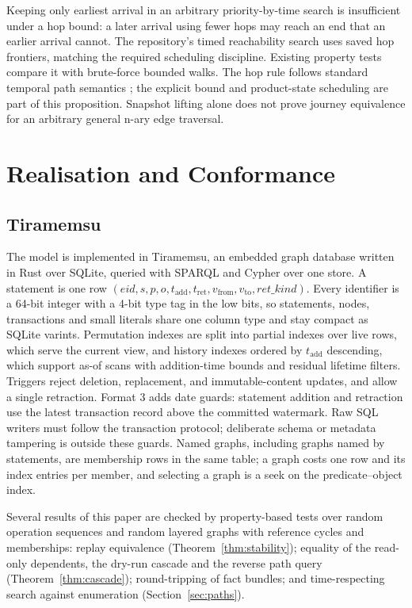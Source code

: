 \documentclass[11pt]{article}
\theoremstyle{plain}
\theoremstyle{definition}
\theoremstyle{remark}
\newcommand{\tadd}{t_{\mathrm{add}}}
\newcommand{\tret}{t_{\mathrm{ret}}}
\begin{document}
Keeping only earliest arrival in an arbitrary priority-by-time search is
insufficient under a hop bound: a later arrival using fewer hops may reach an
end that an earlier arrival cannot. The repository's timed reachability search
uses saved hop frontiers, matching the required scheduling discipline. Existing
property tests compare it with brute-force bounded walks. The hop rule follows
standard temporal path semantics \cite{wu2014path}; the explicit bound and
product-state scheduling are part of this proposition. Snapshot lifting alone
does not prove journey equivalence for an arbitrary general n-ary edge traversal.

\section{Realisation and Conformance}\label{sec:impl}

\subsection{Tiramemsu}

The model is implemented in Tiramemsu, an embedded graph database written in Rust
over SQLite, queried with SPARQL and Cypher over one store. A statement is one
row $(\mathit{eid},s,p,o,\tadd,\tret,v_{\mathrm{from}},v_{\mathrm{to}},\mathit{ret\_kind})$.
Every identifier is a 64-bit integer with a 4-bit type tag in the low bits, so
statements, nodes, transactions and small literals share one column type and stay
compact as SQLite varints. Permutation indexes are split into partial indexes over
live rows, which serve the current view, and history indexes ordered by
$\tadd$ descending, which support as-of scans with addition-time bounds and residual lifetime
filters. Triggers reject deletion, replacement, and immutable-content updates,
and allow a single retraction. Format 3 adds date guards: statement addition
and retraction use the latest transaction record above the committed watermark.
Raw SQL writers must follow the transaction protocol; deliberate schema or
metadata tampering is outside these guards.
Named graphs, including graphs named by statements, are membership rows in the same
table; a graph costs one row and its index entries per member, and selecting a
graph is a seek on the predicate--object index.

Several results of this paper are checked by property-based tests over random
operation sequences and random layered graphs with reference cycles and
memberships: replay equivalence (Theorem~\ref{thm:stability}); equality of the
read-only dependents, the dry-run cascade and the reverse path query
(Theorem~\ref{thm:cascade}); round-tripping of fact bundles; and time-respecting
search against enumeration (Section~\ref{sec:paths}).
\end{document}
